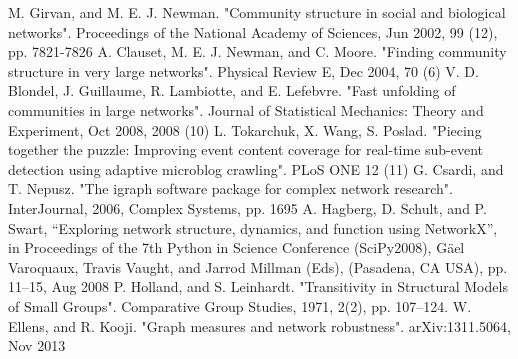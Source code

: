 \documentclass[conference]{IEEEtran}
\begin{document}
\begin{thebibliography}{00}
	 M. Girvan, and M. E. J. Newman. "Community structure in social and biological networks". Proceedings of the National Academy of Sciences, Jun 2002, 99 (12), pp. 7821-7826
	 A. Clauset, M. E. J. Newman, and C. Moore. "Finding community structure in very large networks". Physical Review E, Dec 2004, 70 (6)
	 V. D. Blondel, J. Guillaume, R. Lambiotte, and E. Lefebvre. "Fast unfolding of communities in large networks". Journal of Statistical Mechanics: Theory and Experiment, Oct 2008, 2008 (10)
	 L. Tokarchuk, X. Wang, S. Poslad. "Piecing together the puzzle: Improving event content coverage for real-time sub-event detection using adaptive microblog crawling". PLoS ONE 12 (11)
	 G. Csardi, and T. Nepusz. "The igraph software package for complex network research". InterJournal, 2006, Complex Systems, pp. 1695
	 A. Hagberg, D. Schult, and P. Swart, “Exploring network structure, dynamics, and function using NetworkX”, in Proceedings of the 7th Python in Science Conference (SciPy2008), Gäel Varoquaux, Travis Vaught, and Jarrod Millman (Eds), (Pasadena, CA USA), pp. 11–15, Aug 2008
	 P. Holland, and S. Leinhardt. "Transitivity in Structural Models of Small Groups". Comparative Group Studies, 1971, 2(2), pp. 107–124.
	 W. Ellens, and R. Kooji. "Graph measures and network robustness".  arXiv:1311.5064, Nov 2013
\end{thebibliography}
\end{document}

